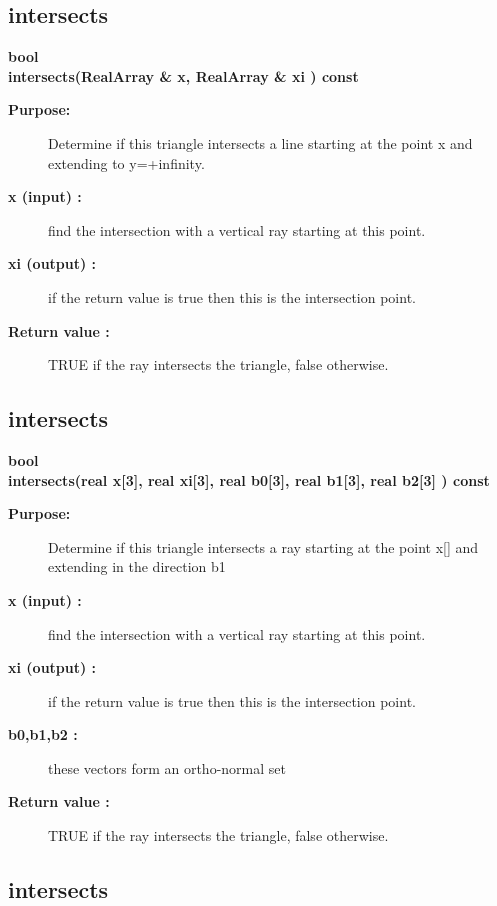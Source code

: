 \subsection{intersects}
 
\begin{flushleft} \textbf{%
bool  \\ 
\settowidth{\TriangleIncludeArgIndent}{intersects(}%
intersects(RealArray \& x, RealArray \&  xi ) const
}\end{flushleft}
\begin{description}
\item[{\bf Purpose:}]  
   Determine if this triangle intersects a line starting at the point x and
     extending to y=+infinity.
\item[{\bf x (input) :}]  find the intersection with a vertical ray starting at this point.
\item[{\bf xi (output) :}]  if the return value is true then this is the intersection point.
\item[{\bf Return value :}]  TRUE if the ray intersects the triangle, false otherwise.
\end{description}
\subsection{intersects}
 
\begin{flushleft} \textbf{%
bool  \\ 
\settowidth{\TriangleIncludeArgIndent}{intersects(}%
intersects(real x[3], real xi[3], real b0[3], real b1[3], real b2[3]  ) const
}\end{flushleft}
\begin{description}
\item[{\bf Purpose:}]  
   Determine if this triangle intersects a ray starting at the point x[] and
     extending in the direction b1
\item[{\bf x (input) :}]  find the intersection with a vertical ray starting at this point.
\item[{\bf xi (output) :}]  if the return value is true then this is the intersection point.
\item[{\bf b0,b1,b2 :}]  these vectors form an ortho-normal set
\item[{\bf Return value :}]  TRUE if the ray intersects the triangle, false otherwise.
\end{description}
\subsection{intersects}
 
